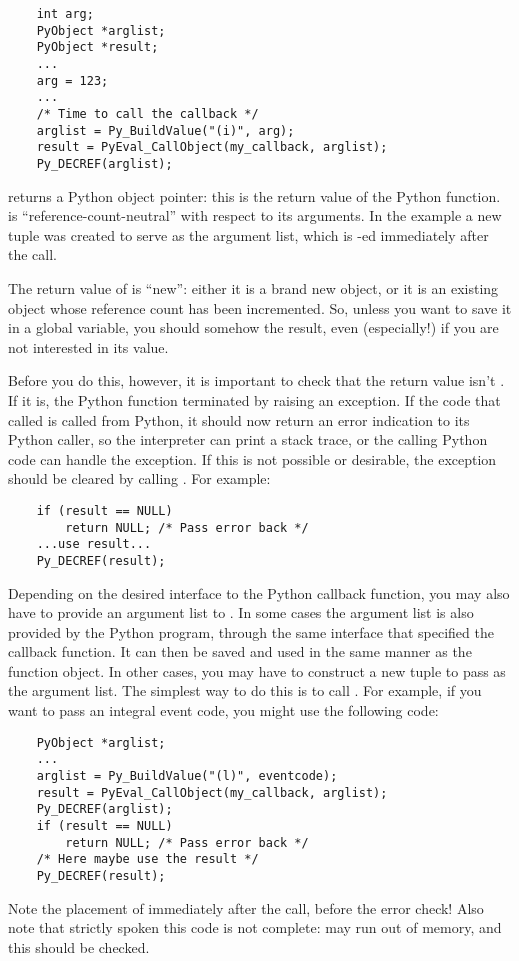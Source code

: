 \documentclass[twoside,openright]{report}
\begin{document}
\bcode\begin{verbatim}
    int arg;
    PyObject *arglist;
    PyObject *result;
    ...
    arg = 123;
    ...
    /* Time to call the callback */
    arglist = Py_BuildValue("(i)", arg);
    result = PyEval_CallObject(my_callback, arglist);
    Py_DECREF(arglist);
\end{verbatim}\ecode
%
 returns a Python object pointer: this is
the return value of the Python function.   is
``reference-count-neutral'' with respect to its arguments.  In the
example a new tuple was created to serve as the argument list, which
is -ed immediately after the call.

The return value of  is ``new'': either it
is a brand new object, or it is an existing object whose reference
count has been incremented.  So, unless you want to save it in a
global variable, you should somehow  the result,
even (especially!) if you are not interested in its value.

Before you do this, however, it is important to check that the return
value isn't \NULL{}.  If it is, the Python function terminated by raising
an exception.  If the \C{} code that called  is
called from Python, it should now return an error indication to its
Python caller, so the interpreter can print a stack trace, or the
calling Python code can handle the exception.  If this is not possible
or desirable, the exception should be cleared by calling
.  For example:

\bcode\begin{verbatim}
    if (result == NULL)
        return NULL; /* Pass error back */
    ...use result...
    Py_DECREF(result); 
\end{verbatim}\ecode
%
Depending on the desired interface to the Python callback function,
you may also have to provide an argument list to .
In some cases the argument list is also provided by the Python
program, through the same interface that specified the callback
function.  It can then be saved and used in the same manner as the
function object.  In other cases, you may have to construct a new
tuple to pass as the argument list.  The simplest way to do this is to
call .  For example, if you want to pass an integral
event code, you might use the following code:

\bcode\begin{verbatim}
    PyObject *arglist;
    ...
    arglist = Py_BuildValue("(l)", eventcode);
    result = PyEval_CallObject(my_callback, arglist);
    Py_DECREF(arglist);
    if (result == NULL)
        return NULL; /* Pass error back */
    /* Here maybe use the result */
    Py_DECREF(result);
\end{verbatim}\ecode
%
Note the placement of  immediately after the call,
before the error check!  Also note that strictly spoken this code is
not complete:  may run out of memory, and this should
be checked.
\end{document}
